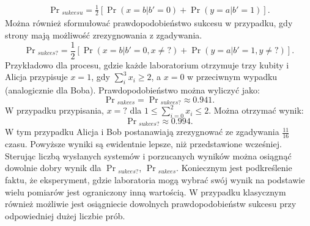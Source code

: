 \documentclass[10pt]{article} %
\begin{document}
\begin{equation}
\begin{split}
\Pr{}_{sukcesu} = \frac{1}{2} \left[ \Pr(x=b|b'=0) + \Pr(y=a|b' = 1)\right].
\end{split}
\end{equation}
Można również sformułować prawdopodobieństwo sukcesu w przypadku, gdy strony mają możliwość zrezygnowania z zgadywania. %
\begin{equation}
\Pr{}_{sukces?} = \frac{1}{2} \left[ \Pr(x=b|b'=0, x\neq?) + \Pr(y=a|b' = 1, y\neq?)\right].
\end{equation} Przykładowo dla procesu, gdzie każde laboratorium otrzymuje trzy kubity i Alicja przypisuje $x=1$, gdy $\sum_i^3 x_i \geq 2$, a $x=0$ w przeciwnym wypadku (analogicznie dla Boba). Prawdopodobieństwo można wyliczyć jako:
\begin{equation}
\Pr{}_{sukces} = \Pr{}_{sukces?} \approx 0.941.
\end{equation} W przypadku przypisania, $x=?$ dla $1 \leq \sum_{i=0}^2 x_i \leq 2$. Można otrzymać wynik:
\begin{equation}
\Pr{}_{sukces?} \approx 0.994.
\end{equation}
W tym przypadku Alicja i Bob postanawiają zrezygnować ze zgadywania $\frac{11}{16}$ czasu. Powyższe wyniki są ewidentnie lepsze, niż przedstawione wcześniej. Sterując liczbą wysłanych systemów i porzucanych wyników można osiągnąć dowolnie dobry wynik dla $\Pr{}_{sukces?}$, $\Pr{}_{sukces}$. Koniecznym jest podkreślenie faktu, że eksperyment, gdzie laboratoria mogą wybrać swój wynik na podstawie wielu pomiarów jest ograniczony inną wartością.
W przypadku klasycznym również możliwie jest osiągniecie dowolnych prawdopodobieństw sukcesu przy odpowiedniej dużej liczbie prób.
\end{document}
